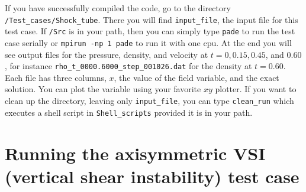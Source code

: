 \documentclass[11pt]{amsart}
\begin{document}
If you have successfully compiled the code, go to the directory {\tt /Test\_cases/Shock\_tube}.  There you will find {\tt input\_file}, the input file for this test case.  If {\tt /Src} is in your path, then you can simply type {\tt pade} to run the test case serially or {\tt mpirun -np 1 pade} to run it with one cpu.  At the end you will see output files for the pressure, density, and velocity at $t = 0, 0.15, 0.45$, and $0.60$, for instance {\tt rho\_t\_0000.6000\_step\_001026.dat} for the density at $t = 0.60$.  Each file has three columns, $x$, the value of the field variable, and the exact solution.  You can plot the variable using your favorite $xy$ plotter.  If you want to clean up the directory, leaving only {\tt input\_file}, you can type {\tt clean\_run} which executes a shell script in {\tt Shell\_scripts} provided it is in your path. 

\section{Running the axisymmetric VSI (vertical shear instability) test case}
\end{document}

